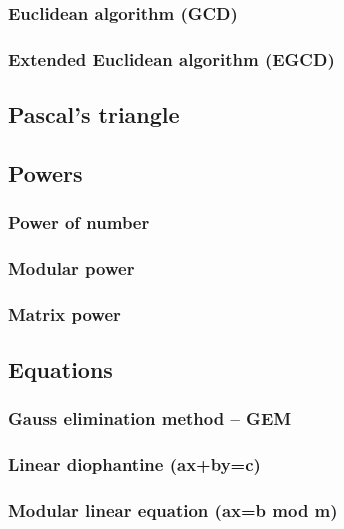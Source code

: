 \documentclass[a4paper]{article}
\begin{document}
\begin{multicols*}{2}
        \subsubsection{Euclidean algorithm (GCD)}
            
        \subsubsection{Extended Euclidean algorithm (EGCD)}
            
    \subsection{Pascal's triangle}
        
    \subsection{Powers}
        \subsubsection{Power of number}
            
        \subsubsection{Modular power}
            
        \subsubsection{Matrix power}
            
    \subsection{Equations}
        \subsubsection{Gauss elimination method -- GEM}
            
        \subsubsection{Linear diophantine (ax+by=c)}
            
        \subsubsection{Modular linear equation (ax=b mod m)}
            

\end{multicols*}
\end{document}
